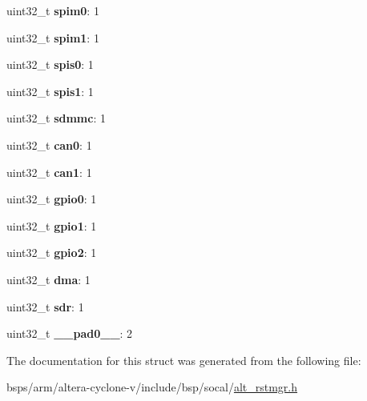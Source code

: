 \begin{DoxyCompactItemize}
uint32\+\_\+t {\bfseries spim0}\+: 1
\item 
\mbox{\label{structALT__RSTMGR__PERMODRST__s_aa423d68689181e8140555ab79d57e641}} 
uint32\+\_\+t {\bfseries spim1}\+: 1
\item 
\mbox{\label{structALT__RSTMGR__PERMODRST__s_a844e2bf8c4873b151e214fbefa16def4}} 
uint32\+\_\+t {\bfseries spis0}\+: 1
\item 
\mbox{\label{structALT__RSTMGR__PERMODRST__s_a8f057b26fd4cbb8d3a5bdf4cce806091}} 
uint32\+\_\+t {\bfseries spis1}\+: 1
\item 
\mbox{\label{structALT__RSTMGR__PERMODRST__s_a67e50ab96ab13a0971844a84e83e0f2b}} 
uint32\+\_\+t {\bfseries sdmmc}\+: 1
\item 
\mbox{\label{structALT__RSTMGR__PERMODRST__s_af9fe8d8b217afe93e524875173f29888}} 
uint32\+\_\+t {\bfseries can0}\+: 1
\item 
\mbox{\label{structALT__RSTMGR__PERMODRST__s_a443c0235164af1e8eee13597af46647d}} 
uint32\+\_\+t {\bfseries can1}\+: 1
\item 
\mbox{\label{structALT__RSTMGR__PERMODRST__s_a43d9a7c3baa7d7b254b717d306f7b333}} 
uint32\+\_\+t {\bfseries gpio0}\+: 1
\item 
\mbox{\label{structALT__RSTMGR__PERMODRST__s_a38fe517836e8a590aaaa5336e612989c}} 
uint32\+\_\+t {\bfseries gpio1}\+: 1
\item 
\mbox{\label{structALT__RSTMGR__PERMODRST__s_aa641bd60f2ffe5ba12263a68217d8db8}} 
uint32\+\_\+t {\bfseries gpio2}\+: 1
\item 
\mbox{\label{structALT__RSTMGR__PERMODRST__s_afdcb91b2e0601b6e39dd23ef1a50da82}} 
uint32\+\_\+t {\bfseries dma}\+: 1
\item 
\mbox{\label{structALT__RSTMGR__PERMODRST__s_a95f6ec3c8d60e097c376674297223a47}} 
uint32\+\_\+t {\bfseries sdr}\+: 1
\item 
\mbox{\label{structALT__RSTMGR__PERMODRST__s_a7e718c79786af73dd5e1d0ce00a70758}} 
uint32\+\_\+t {\bfseries \+\_\+\+\_\+pad0\+\_\+\+\_\+}\+: 2
\end{DoxyCompactItemize}


The documentation for this struct was generated from the following file\+:\begin{DoxyCompactItemize}
\item 
bsps/arm/altera-\/cyclone-\/v/include/bsp/socal/\mbox{\hyperlink{alt__rstmgr_8h}{alt\+\_\+rstmgr.\+h}}\end{DoxyCompactItemize}
